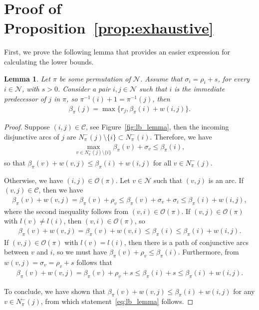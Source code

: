 \documentclass[a4paper]{article}
\theoremstyle{definition}
\theoremstyle{plain}
\newtheorem{lemma}{Lemma}
\begin{document}




\newpage

\appendix

\section{Proof of Proposition~\ref{prop:exhaustive}}

First, we prove the following lemma that provides an easier expression for
calculating the lower bounds.

\begin{lemma}\label{lb_lemma}
  Let $\pi$ be some permutation of $\mathcal{N}$. Assume that
  $\sigma_{i} = \rho_{i} + s$, for every $i \in \mathcal{N}$, with $s > 0$.
  Consider a pair $i,j \in \mathcal{N}$ such that $i$ is the immediate predecessor
  of $j$ in $\pi$, so $\pi^{-1}(i) + 1 = \pi^{-1}(j)$, then
\begin{align}
  \label{eq:lb_lemma}
  \beta_\pi(j) = \max \{ r_{j}, \beta_\pi(i) + w(i, j) \} .
\end{align}
\end{lemma}
\begin{proof}
  Suppose $(i,j) \in \mathcal{C}$, see Figure~\ref{fig:lb_lemma},
  then the incoming disjunctive arcs of $j$ are
  $N^{-}_{\pi}(j) \setminus \{ i \} \subset N^{-}_{\pi}(i)$. Therefore, we have
  \begin{align*}
    \max_{v \in N^{-}_{\pi}(j) \setminus \{i\}} \beta_\pi(v) + \sigma_{v} \leq \beta_\pi(i) ,
  \end{align*}
  so that
      $\beta_\pi(v) + w(v,j) \leq \beta_\pi(i) + w(i,j)$
  for all $v \in N_{\pi}^{-}(j)$.

  Otherwise, we have $(i, j) \in \mathcal{O}(\pi)$.
  Let $v \in \mathcal{N}$ such that $(v, j)$ is an arc.
  If $(v,j) \in \mathcal{C}$, then we have
  \begin{align*}
    \beta_\pi(v) + w(v,j) =
    \beta_\pi(v) + \rho_{v} \leq \beta_\pi(v) + \sigma_{v} + \sigma_{i} \leq \beta_\pi(i) + w(i,j) ,
  \end{align*}
  where the second inequality follows from $(v,i) \in \mathcal{O}(\pi)$.
  If $(v, j) \in \mathcal{O}(\pi)$ with $l(v) \neq l(i)$, then $(v,i) \in \mathcal{O}(\pi)$, so
  \begin{align*}
    \beta_\pi(v) + w(v, j) = \beta_\pi(v) + w(v, i) \leq \beta_\pi(i) \leq \beta_\pi(i) + w(i,j) .
  \end{align*}
  If $(v, j) \in \mathcal{O}(\pi)$ with $l(v) = l(i)$, then there is a path of conjunctive arcs between $v$ and
  $i$, so we must have $\beta_\pi(v) + \rho_{v} \leq \beta_\pi(i)$.
  Furthermore, from $w(v,j) = \sigma_{v} = \rho_{v} + s$ follows that
  \begin{align*}
    \beta_\pi(v) + w(v,j) = \beta_\pi(v) + \rho_{v} + s \leq \beta_\pi(i) + s \leq \beta_\pi(i) + w(i, j) .
  \end{align*}

  To conclude, we have shown that
  $\beta_\pi(v) + w(v,j) \leq \beta_\pi(i) + w(i,j)$ for any
  $v \in N^{-}_{\pi}(j)$, from which statement~\eqref{eq:lb_lemma} follows.
\end{proof}
\end{document}
